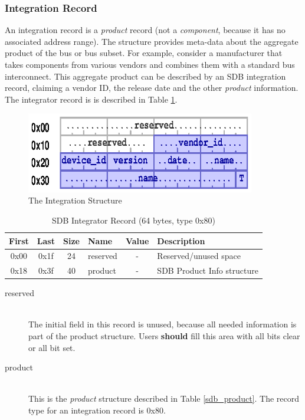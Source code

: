 \documentclass[a4paper, 12pt]{article}
\begin{document}
\subsubsection{Integration Record}

An integration record is a \textit{product} record (not a \textit{component}, because
it has no associated address range).
The structure provides meta-data about the aggregate product of the bus or bus subset.
For example, consider
a manufacturer that takes components from various vendors and combines them with a standard bus
interconnect. This aggregate product can be described by an SDB integration record, claiming
a vendor ID, the release date and the other \textit{product} information.
The integrator record is is described in Table \ref{sdb_integrator}.

\begin{figure}[h]
\centering%
\includegraphics[width=100mm]{img/sdb-integration.ps}
\caption{The Integration Structure}
\label{fig:FigureIntegration}
\end{figure}

\begin{center}
  \begin{savenotes}
    \begin{table}[!ht]\footnotesize
      \caption{SDB Integrator Record (64 bytes, type 0x80)}\label{sdb_integrator}\centering
        \begin{tabular}{| c | c | c | l | c | p{5cm} |} \hline
        First & Last & Size & Name & Value & Description \\ \hline
        0x00 & 0x1f & 24 & reserved & - & Reserved/unused space \\ \hline
        0x18 & 0x3f & 40 & product & - & SDB Product Info structure \\ \hline
        \end{tabular}
    \end{table}
  \end{savenotes}
\end{center}

\begin{description}
\item[reserved] \hfill \\
The initial field in this record is unused, because all needed information is
part of the product structure. Users \textbf{should} fill this area with all bits
clear or all bit set.

\item[product] \hfill \\
This is the \textit{product} structure described in Table \ref{sdb_product}. The
record type for an integration record is 0x80.
\end{description}
\end{document}
